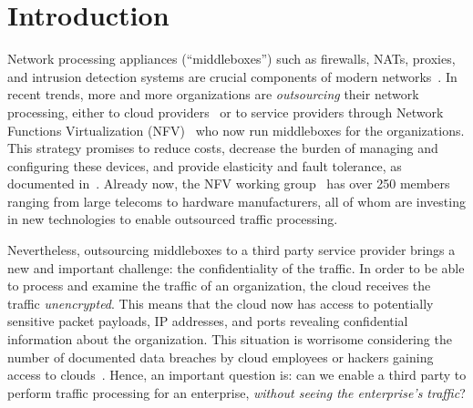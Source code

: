 

\section{Introduction}\label{sec:intro}


    Network processing appliances (``middleboxes'') such as firewalls, NATs, proxies, and intrusion detection systems are crucial components of modern networks~\cite{aplomb}. 
     In recent trends, more and more organizations are {\it outsourcing} their network processing, either to cloud providers~\cite{aplomb, aryaka, zscalar} or to service providers through Network Functions Virtualization (NFV)~\cite{nfv} who now run  middleboxes for the organizations. This strategy promises to reduce costs, decrease the burden of managing and configuring these devices, and provide elasticity and fault tolerance, as documented in~\cite{aplomb}.
Already now, the NFV working group~\cite{nfvwg} has over 250 members ranging from large telecoms to hardware manufacturers, all of whom are investing in new technologies to enable outsourced traffic processing.
   
   Nevertheless, outsourcing middleboxes to a third party service provider brings a new and important challenge: the confidentiality of the traffic. In order to be able to process and examine the traffic of an organization, the cloud  receives  the traffic {\em unencrypted}.  This means that the cloud now has access to potentially sensitive packet payloads,  IP addresses, and ports revealing confidential information about the organization. This situation is worrisome considering the number of documented data breaches by cloud employees or hackers gaining access to clouds~\cite{PrivacyRecords}.
   Hence, an important question is: can we enable a third party to perform traffic processing for an enterprise, {\em without seeing the enterprise's traffic}?
   
   
   

